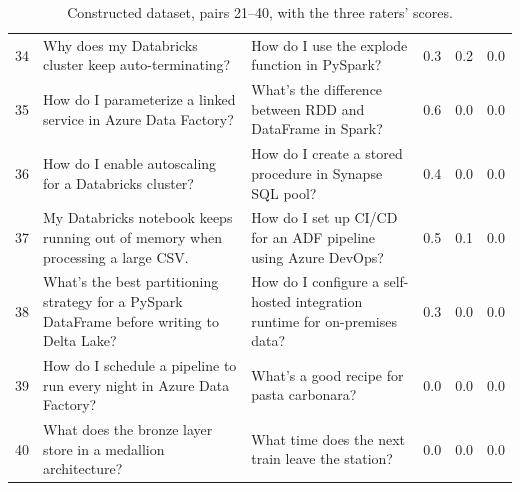 \documentclass[11pt]{article}
\begin{document}
\begin{table}[t]
\begin{tabular}{rp{6.3cm}p{6.3cm}rrr}
34 & Why does my Databricks cluster keep auto-terminating? & How do I use the explode function in PySpark? & 0.3 & 0.2 & 0.0 \\
35 & How do I parameterize a linked service in Azure Data Factory? & What's the difference between RDD and DataFrame in Spark? & 0.6 & 0.0 & 0.0 \\
36 & How do I enable autoscaling for a Databricks cluster? & How do I create a stored procedure in Synapse SQL pool? & 0.4 & 0.0 & 0.0 \\
37 & My Databricks notebook keeps running out of memory when processing a large CSV. & How do I set up CI/CD for an ADF pipeline using Azure DevOps? & 0.5 & 0.1 & 0.0 \\
38 & What's the best partitioning strategy for a PySpark DataFrame before writing to Delta Lake? & How do I configure a self-hosted integration runtime for on-premises data? & 0.3 & 0.0 & 0.0 \\
39 & How do I schedule a pipeline to run every night in Azure Data Factory? & What's a good recipe for pasta carbonara? & 0.0 & 0.0 & 0.0 \\
40 & What does the bronze layer store in a medallion architecture? & What time does the next train leave the station? & 0.0 & 0.0 & 0.0 \\
\bottomrule
\end{tabular}
\caption{Constructed dataset, pairs 21--40, with the three raters' scores.}
\label{tab:data2}
\end{table}
\end{document}
